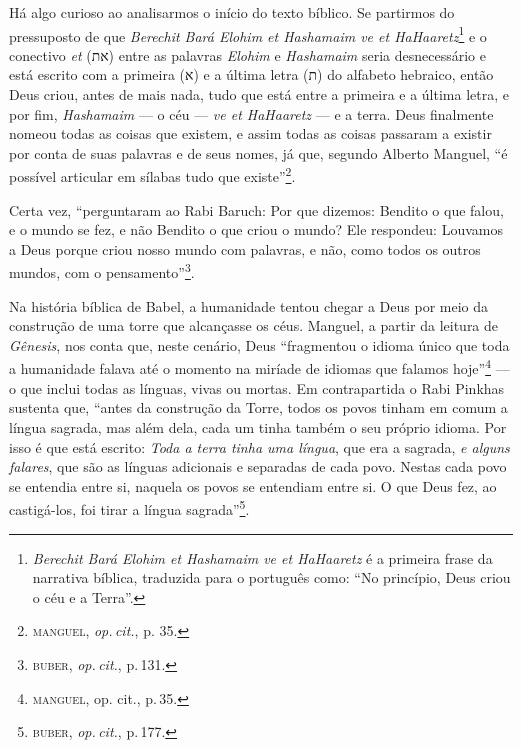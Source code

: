 Há algo curioso ao analisarmos o início do texto bíblico. Se partirmos
do pressuposto de que \emph{Berechit Bará Elohim et Hashamaim ve et
HaHaaretz}\footnote{\emph{Berechit Bará Elohim et Hashamaim ve et
  HaHaaretz} é a primeira frase da narrativa bíblica, traduzida para o
  português como: ``No princípio, Deus criou o céu e a Terra''.} e o
conectivo \emph{et} ({את}) entre as palavras \emph{Elohim} e
\emph{Hashamaim} seria desnecessário e está escrito com a primeira
({א}) e a última letra ({ת}) do alfabeto hebraico, então Deus
criou, antes de mais nada, tudo que está entre a primeira e a última
letra, e por fim, \emph{Hashamaim} --- o céu --- \emph{ve et HaHaaretz}
--- e a terra. Deus finalmente nomeou todas as coisas que existem, e
assim todas as coisas passaram a existir por conta de suas palavras e de
seus nomes, já que, segundo Alberto Manguel, ``é possível
articular em sílabas tudo que existe''\footnote{\textsc{manguel}, \emph{op.\,cit.}, p.
  35.}.


\begin{center}\end{center}


\noindent{}Certa vez, ``perguntaram ao Rabi Baruch: Por que dizemos: Bendito
o que falou, e o mundo se fez, e não Bendito o que criou o mundo? Ele
respondeu: Louvamos a Deus porque criou nosso mundo com palavras, e
não, como todos os outros mundos, com o pensamento''\footnote{\textsc{buber},
  \emph{op.\,cit.}, p.\,131.}.

\begin{center}\end{center}

\noindent{}Na história bíblica de Babel, a humanidade tentou chegar a Deus por meio
da construção de uma torre que alcançasse os céus. Manguel, a partir da
leitura de \emph{Gênesis}, nos conta que, neste cenário, Deus
``fragmentou o idioma único que toda a humanidade falava até o
momento na miríade de idiomas que falamos hoje''\footnote{\textsc{manguel}, op.
  cit., p.\,35.} --- o que inclui todas as línguas, vivas ou mortas. Em
contrapartida o Rabi Pinkhas sustenta que, ``antes da construção
da Torre, todos os povos tinham em comum a língua sagrada, mas além
dela, cada um tinha também o seu próprio idioma. Por isso é que está
escrito: \emph{Toda a terra tinha uma língua}, que era a sagrada, \emph{e alguns
falares}, que são as línguas adicionais e separadas de cada povo. Nestas
cada povo se entendia entre si, naquela os povos se entendiam entre si.
O que Deus fez, ao castigá-los, foi tirar a língua
sagrada''\footnote{\textsc{buber}, \emph{op.\,cit.}, p.\,177.}.

